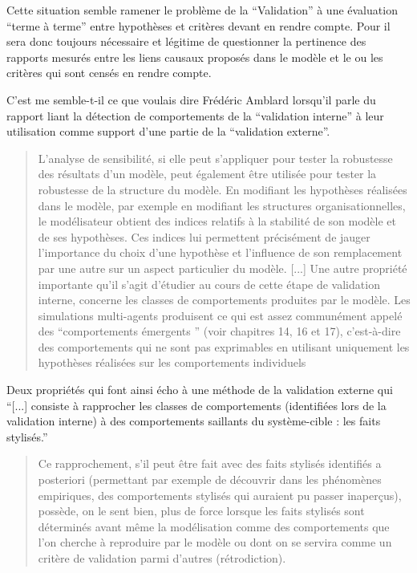 Cette situation semble ramener le problème de la \enquote{Validation} à une évaluation \enquote{terme à terme} entre hypothèses et critères devant en rendre compte. Pour \textcite{Bulle2005} il sera donc toujours nécessaire et légitime de questionner la pertinence des rapports mesurés entre les liens causaux proposés dans le modèle et le ou les critères qui sont censés en rendre compte.


C’est me semble-t-il ce que voulais dire Frédéric Amblard \textcite{Amblard2006} lorsqu’il parle du rapport liant la détection de comportements de la \enquote{validation interne} à leur utilisation comme support d’une partie de la \enquote{validation externe}.  

\blockquote[\cite{Amblard2006}]{L'analyse de sensibilité, si elle peut s'appliquer pour tester la robustesse des résultats d'un modèle, peut également être utilisée pour tester la robustesse de la structure du modèle. En modifiant les hypothèses réalisées dans le modèle, par exemple en modifiant les structures organisationnelles, le modélisateur obtient des indices relatifs à la stabilité de son modèle et de ses hypothèses. Ces indices lui permettent précisément de jauger l'importance du choix d’une hypothèse et l’influence de son remplacement par une autre sur un aspect particulier du modèle. [...] Une autre propriété importante qu'il s'agit d'étudier au cours de cette étape de validation interne, concerne les classes de comportements produites par le modèle. Les simulations multi-agents produisent ce qui est assez communément appelé des \enquote{comportements émergents }  (voir chapitres 14, 16 et 17), c'est-à-dire des comportements qui ne sont pas exprimables en utilisant uniquement les hypothèses réalisées sur les comportements individuels}.

Deux propriétés qui font ainsi écho à une méthode de la validation externe qui \enquote{[...] consiste à rapprocher les classes de comportements (identifiées lors de la validation interne) à des comportements saillants du système-cible : les faits stylisés.}

\blockquote[\cite{Amblard2006}]{Ce rapprochement, s’il peut être fait avec des faits stylisés identifiés a posteriori (permettant par exemple de découvrir dans les phénomènes empiriques, des comportements stylisés qui auraient pu passer inaperçus), possède, on le sent bien, plus de force lorsque les faits stylisés sont déterminés avant même la modélisation comme des comportements que l'on cherche à reproduire par le modèle ou dont on se servira comme un critère de validation parmi d'autres (rétrodiction).}

